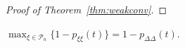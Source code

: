 \begin{proof}[Proof of Theorem~\ref{thm:weakconv}]
\end{proof}




\begin{lemma}\label{thm:maximum_pr}
$\max_{\xi\in \mathcal{P}_n} \{1 - p_{\xi\xi}(t)\} = 1 - p_{\Delta\Delta}(t)$.
\end{lemma}

